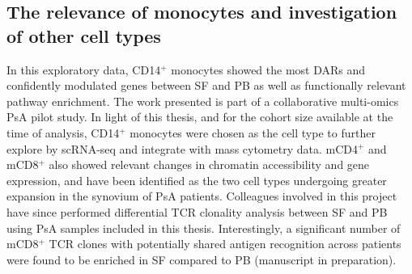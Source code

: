 \subsection{The relevance of monocytes and investigation of other cell types}
In this exploratory data, CD14$^+$ monocytes showed the most DARs and confidently modulated genes between SF and PB as well as functionally relevant pathway enrichment. The work presented is part of a collaborative multi-omics PsA pilot study. In light of this thesis, and for the cohort size available at the time of analysis, CD14$^+$ monocytes were chosen as the cell type to further explore by scRNA-seq and integrate with mass cytometry data. mCD4$^+$ and mCD8$^+$ also showed relevant changes in chromatin accessibility and gene expression, and have been identified as the two cell types undergoing greater expansion in the synovium of PsA patients. Colleagues involved in this project have since performed differential TCR clonality analysis between SF and PB using PsA samples included in this thesis. Interestingly, a significant number of mCD8$^+$ TCR clones with potentially shared antigen recognition across patients were found to be enriched in SF compared to PB (manuscript in preparation).  

